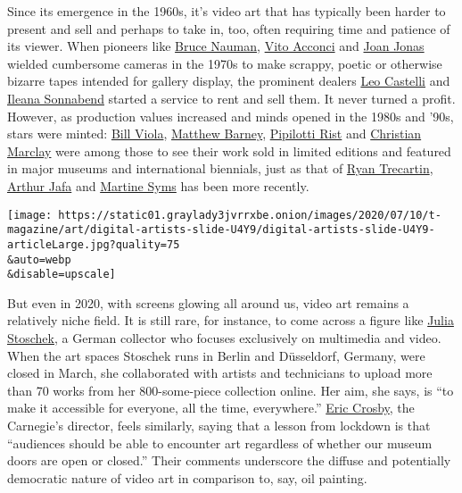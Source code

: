 Since its emergence in the 1960s, it's video art that has typically been
harder to present and sell and perhaps to take in, too, often requiring
time and patience of its viewer. When pioneers like
\href{https://www.nytimes3xbfgragh.onion/2018/10/15/t-magazine/bruce-nauman-art-interview.html}{Bruce
Nauman},
\href{https://www.nytimes3xbfgragh.onion/2017/04/28/arts/design/vito-acconci-dead-performance-artist.html}{Vito
Acconci} and
\href{https://www.nytimes3xbfgragh.onion/2015/04/05/t-magazine/joan-jonas-reanimation-venice-biennale.html}{Joan
Jonas} wielded cumbersome cameras in the 1970s to make scrappy, poetic
or otherwise bizarre tapes intended for gallery display, the prominent
dealers
\href{https://www.nytimes3xbfgragh.onion/1999/08/23/arts/leo-castelli-influential-art-dealer-dies-at-91.html}{Leo
Castelli} and
\href{https://www.nytimes3xbfgragh.onion/2007/10/24/arts/24sonnabend.html}{Ileana
Sonnabend} started a service to rent and sell them. It never turned a
profit. However, as production values increased and minds opened in the
1980s and '90s, stars were minted:
\href{https://www.nytimes3xbfgragh.onion/2017/03/14/t-magazine/art/bill-viola-palazzo-strozzi-florence.html}{Bill
Viola},
\href{https://www.nytimes3xbfgragh.onion/1999/10/10/magazine/the-importance-of-matthew-barney.html}{Matthew
Barney},
\href{https://www.nytimes3xbfgragh.onion/2016/10/22/arts/design/pipilotti-rist-provoking-with-delight.html}{Pipilotti
Rist} and
\href{https://www.nytimes3xbfgragh.onion/2018/11/19/arts/music/christian-marclay-huddersfield-music-festival.html}{Christian
Marclay} were among those to see their work sold in limited editions and
featured in major museums and international biennials, just as that of
\href{https://www.guggenheim.org/artwork/artist/ryan-trecartin}{Ryan
Trecartin},
\href{https://www.nytimes3xbfgragh.onion/2019/08/14/t-magazine/arthur-jafa-in-bloom.html}{Arthur
Jafa} and
\href{https://www.nytimes3xbfgragh.onion/2016/12/06/t-magazine/art/martine-syms-artist-poster-phrase.html}{Martine
Syms} has been more recently.

\texttt{[image: https://static01.graylady3jvrrxbe.onion/images/2020/07/10/t-magazine/art/digital-artists-slide-U4Y9/digital-artists-slide-U4Y9-articleLarge.jpg?quality=75\\\&auto=webp\\\&disable=upscale]}

But even in 2020, with screens glowing all around us, video art remains
a relatively niche field. It is still rare, for instance, to come across
a figure like \href{https://www.jsc.art/}{Julia Stoschek}, a German
collector who focuses exclusively on multimedia and video. When the art
spaces Stoschek runs in Berlin and Düsseldorf, Germany, were closed in
March, she collaborated with artists and technicians to upload more than
70 works from her 800-some-piece collection online. Her aim, she says,
is ``to make it accessible for everyone, all the time, everywhere.''
\href{https://carnegiemuseums.org/expert/eric-crosby/}{Eric Crosby}, the
Carnegie's director, feels similarly, saying that a lesson from lockdown
is that ``audiences should be able to encounter art regardless of
whether our museum doors are open or closed.'' Their comments underscore
the diffuse and potentially democratic nature of video art in comparison
to, say, oil painting.

